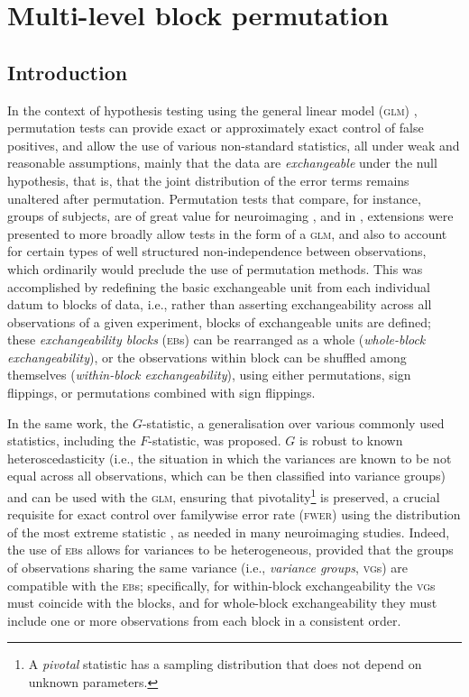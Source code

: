 \chapter{Multi-level block permutation}
\setstretch{\lspac}

\section{Introduction}

In the context of hypothesis testing using the general linear model (\textsc{glm}) \citep{Scheffe1959, Searle1971}, permutation tests can provide exact or approximately exact control of false positives, and allow the use of various non-standard statistics, all under weak and reasonable assumptions, mainly that the data are \emph{exchangeable} under the null hypothesis, that is, that the joint distribution of the error terms remains unaltered after permutation. Permutation tests that compare, for instance, groups of subjects, are of great value for neuroimaging \citep{Holmes1996, Nichols2002}, and in \citet{Winkler2014}, extensions were presented to more broadly allow tests in the form of a \textsc{glm}, and also to account for certain types of well structured non-independence between observations, which ordinarily would preclude the use of permutation methods. This was accomplished by redefining the basic exchangeable unit from each individual datum to blocks of data, i.e., rather than asserting exchangeability across all observations of a given experiment, blocks of exchangeable units are defined; these \emph{exchangeability blocks} (\textsc{eb}s) can be rearranged as a whole (\emph{whole-block exchangeability}), or the observations within block can be shuffled among themselves (\emph{within-block exchangeability}), using either permutations, sign flippings, or permutations combined with sign flippings.

In the same work, the $G$-statistic, a generalisation over various commonly used statistics, including the $F$-statistic, was proposed. $G$ is robust to known heteroscedasticity (i.e., the situation in which the variances are known to be not equal across all observations, which can be then classified into variance groups) and can be used with the \textsc{glm}, ensuring that pivotality\footnote{A \emph{pivotal} statistic has a sampling distribution that does not depend on unknown parameters.} is preserved, a crucial requisite for exact control over familywise error rate (\textsc{fwer}) using the distribution of the most extreme statistic \citep{Westfall1993}, as needed in many neuroimaging studies. Indeed, the use of \textsc{eb}s allows for variances to be heterogeneous, provided that the groups of observations sharing the same variance (i.e., \emph{variance groups}, \textsc{vg}s) \citep{Woolrich2004} are compatible with the \textsc{eb}s; specifically, for within-block exchangeability the \textsc{vg}s must coincide with the blocks, and for whole-block exchangeability they must include one or more observations from each block in a consistent order.

